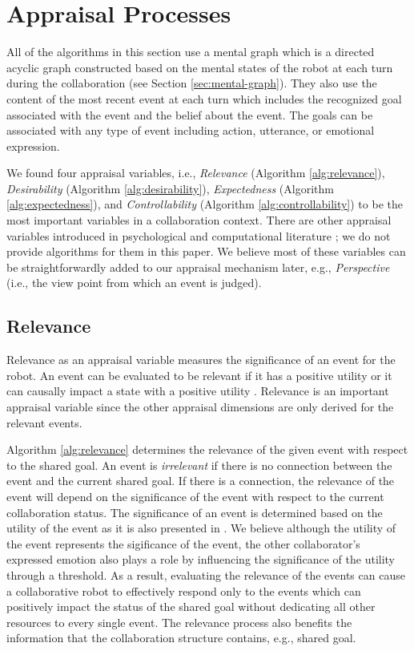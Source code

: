 \documentclass[letterpaper]{article}
\begin{document}
\vspace*{-2mm}
\section{Appraisal Processes}
\label{sec:appraisal-process}

All of the algorithms in this section use a mental graph which is a directed
acyclic graph constructed based on the mental states of the robot at each turn
during the collaboration (see Section \ref{sec:mental-graph}). They also use the
content of the most recent event at each turn which includes the recognized goal
associated with the event and the belief about the event. The goals can be
associated with any type of event including action, utterance, or emotional
expression.

We found four appraisal variables, i.e., \textit{Relevance} (Algorithm
\ref{alg:relevance}), \textit{Desirability} (Algorithm \ref{alg:desirability}),
\textit{Expectedness} (Algorithm \ref{alg:expectedness}), and
\textit{Controllability} (Algorithm \ref{alg:controllability}) to be the most
important variables in a collaboration context. There are other appraisal
variables introduced in psychological \cite{scherer:appraisal-processes} and
computational literature \cite{gratch:domain-independent}; we do not provide
algorithms for them in this paper. We believe most of these variables can be
straightforwardly added to our appraisal mechanism later, e.g.,
\textit{Perspective} (i.e., the view point from which an event is judged).

\subsection{Relevance}

Relevance as an appraisal variable measures the significance of an event for the
robot. An event can be evaluated to be relevant if it has a positive utility or
it can causally impact a state with a positive utility
\cite{marsella:ema-process-model}. Relevance is an important appraisal variable
since the other appraisal dimensions are only derived for the relevant events.

Algorithm \ref{alg:relevance} determines the relevance of the given event with
respect to the shared goal. An event is \textit{irrelevant} if there is no
connection between the event and the current shared goal. If there is a
connection, the relevance of the event will depend on the significance of the
event with respect to the current collaboration status. The significance of an
event is determined based on the utility of the event as it is also presented in
\cite{gratch:domain-independent,marsella:ema-process-model}. We believe although
the utility of the event represents the sigificance of the event, the other
collaborator's expressed emotion also plays a role by influencing the
significance of the utility through a threshold. As a result, evaluating the
relevance of the events can cause a collaborative robot to effectively respond
only to the events which can positively impact the status of the shared goal
without dedicating all other resources to every single event. The relevance
process also benefits the information that the collaboration structure contains,
e.g., shared goal.
\end{document}
